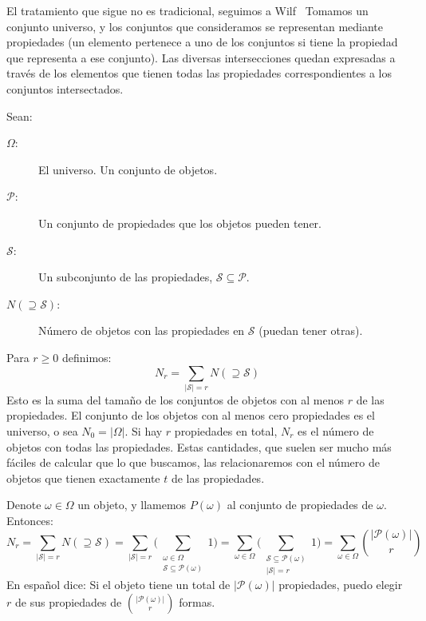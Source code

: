   El tratamiento que sigue no es tradicional,
  seguimos a Wilf~\cite{wilf06:_gfology}%
  Tomamos un conjunto universo,
  y los conjuntos que consideramos
  se representan mediante propiedades%
  (un elemento pertenece a uno de los conjuntos
   si tiene la propiedad que representa a ese conjunto).
  Las diversas intersecciones quedan expresadas
  a través de los elementos
  que tienen todas las propiedades
  correspondientes a los conjuntos intersectados.

  Sean:
  \begin{description}
  \item [\(\Omega\):]
    El universo.
    Un conjunto de objetos.
  \item [\(\mathcal{P}\):]
    Un conjunto de propiedades que los objetos pueden tener.
  \item [\(\mathcal{S}\):]
    Un subconjunto de las propiedades,
    \(\mathcal{S} \subseteq \mathcal{P}\).
  \item [\(N ( \supseteq \mathcal{S} )\):]
    Número de objetos con las propiedades en \(\mathcal{S}\)
    (puedan tener otras).
  \end{description}

  Para \(r \ge 0\) definimos:
  \begin{equation}
    \label{eq:PIE:definicion-Nr}
    N_r
      = \sum_{\lvert \mathcal{S} \rvert = r}
	  N(\supseteq \mathcal{S})
  \end{equation}
  Esto es la suma del tamaño de los conjuntos de objetos
  con al menos \(r\) de las propiedades.
  El conjunto de los objetos con al menos cero propiedades
  es el universo,
  o sea \(N_0 = \lvert \Omega \rvert\).
  Si hay \(r\) propiedades en total,
  \(N_r\) es el número de objetos con todas las propiedades.
  Estas cantidades,
  que suelen ser mucho más fáciles de calcular que lo que buscamos,
  las relacionaremos con el número de objetos
  que tienen exactamente \(t\) de las propiedades.

  Denote \(\omega \in \Omega\) un objeto,
  y llamemos \(P(\omega)\) al conjunto de propiedades de \(\omega\).
  Entonces:
  \begin{equation}
    \label{eq:PIE:Nr-objetos}
    N_r
      = \sum_{\lvert \mathcal{S} \rvert = r}
	  N(\supseteq \mathcal{S})
      = \sum_{\lvert \mathcal{S} \rvert = r}
	  \biggl(
	    \sum_{\substack{
	     \omega \in \Omega \\
	     \mathcal{S} \subseteq \mathcal{P}(\omega)
	  }} 1
	  \biggr)
      = \sum_{\omega \in \Omega}
	  \biggl(
	    \sum_{\substack{
	     \mathcal{S} \subseteq \mathcal{P}(\omega) \\
	     \lvert \mathcal{S} \rvert = r
	  }} 1
	  \biggr)
      = \sum_{\omega \in \Omega}
	   \binom{\lvert \mathcal{P}(\omega) \rvert}{r}
  \end{equation}
  En español dice:
  Si el objeto
  tiene un total
  de \(\lvert \mathcal{P}(\omega) \rvert\) propiedades,
  puedo elegir \(r\) de sus propiedades
  de \(\binom{\lvert \mathcal{P}(\omega) \rvert}{r}\) formas.

